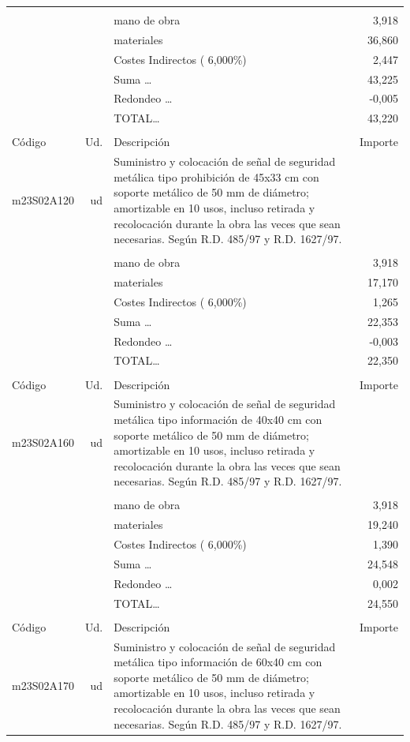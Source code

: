 \documentclass{book}%
\begin{document}
\begin{supertabular}{l r p{60mm} r}
&&&\\%
&&mano de obra&     3,918\\%
&&materiales&    36,860\\%
&&Costes Indirectos (     6,000\%)&     2,447\\%
&&Suma \ldots&    43,225\\%
&&Redondeo \ldots&    {-}0,005\\%
%
&&TOTAL\ldots&    43,220\\%
&&&\\%
Código&Ud.&Descripción&Importe\\%
\hline%
m23S02A120&ud&Suministro y colocación de señal de seguridad metálica tipo prohibición de 45x33 cm con soporte metálico de 50 mm de diámetro; amortizable en 10 usos, incluso retirada y recolocación durante la obra las veces que sean necesarias. Según R.D. 485/97 y R.D. 1627/97.&\\%
&&&\\%
&&mano de obra&     3,918\\%
&&materiales&    17,170\\%
&&Costes Indirectos (     6,000\%)&     1,265\\%
&&Suma \ldots&    22,353\\%
&&Redondeo \ldots&    {-}0,003\\%
%
&&TOTAL\ldots&    22,350\\%
&&&\\%
Código&Ud.&Descripción&Importe\\%
\hline%
m23S02A160&ud&Suministro y colocación de señal de seguridad metálica tipo información de 40x40 cm con soporte metálico de 50 mm de diámetro; amortizable en 10 usos, incluso retirada y recolocación durante la obra las veces que sean necesarias. Según R.D. 485/97 y R.D. 1627/97.&\\%
&&&\\%
&&mano de obra&     3,918\\%
&&materiales&    19,240\\%
&&Costes Indirectos (     6,000\%)&     1,390\\%
&&Suma \ldots&    24,548\\%
&&Redondeo \ldots&     0,002\\%
%
&&TOTAL\ldots&    24,550\\%
&&&\\%
Código&Ud.&Descripción&Importe\\%
\hline%
m23S02A170&ud&Suministro y colocación de señal de seguridad metálica tipo información de 60x40 cm con soporte metálico de 50 mm de diámetro; amortizable en 10 usos, incluso retirada y recolocación durante la obra las veces que sean necesarias. Según R.D. 485/97 y R.D. 1627/97.&\\%

\end{supertabular}
\end{document}
